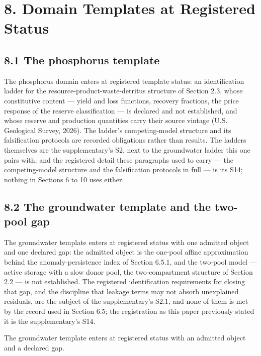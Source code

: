 \documentclass[11pt]{article}
\begin{document}
\vspace{0.8em}

\section*{8. Domain Templates at Registered Status}\label{8-domain-templates-at-registered-status}

\subsection*{8.1 The phosphorus template}\label{81-the-phosphorus-template}

The phosphorus domain enters at registered template status: an identification ladder for the resource-product-waste-detritus structure of Section 2.3, whose constitutive content --- yield and loss functions, recovery fractions, the price response of the reserve classification --- is declared and not established, and whose reserve and production quantities carry their source vintage (U.S. Geological Survey, 2026). The ladder's competing-model structure and its falsification protocols are recorded obligations rather than results. The ladders themselves are the supplementary's S2, next to the groundwater ladder this one pairs with, and the registered detail these paragraphs used to carry --- the competing-model structure and the falsification protocols in full --- is its S14; nothing in Sections 6 to 10 uses either.

\subsection*{8.2 The groundwater template and the two-pool gap}\label{82-the-groundwater-template-and-the-two-pool-gap}

The groundwater template enters at registered status with one admitted object and one declared gap: the admitted object is the one-pool affine approximation behind the anomaly-persistence index of Section 6.5.1, and the two-pool model --- active storage with a slow donor pool, the two-compartment structure of Section 2.2 --- is not established. The registered identification requirements for closing that gap, and the discipline that leakage terms may not absorb unexplained residuals, are the subject of the supplementary's S2.1, and none of them is met by the record used in Section 6.5; the registration as this paper previously stated it is the supplementary's S14.

The groundwater template enters at registered status with an admitted object and a declared gap.
\end{document}
